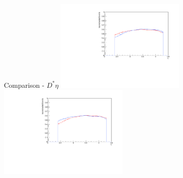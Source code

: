 \documentclass[11pt]{beamer}
\begin{document}
\begin{frame}{Comparison - $D^* \eta$}
\centering
\includegraphics[width=0.48\textwidth]{up_pdf/combined/h_eta_reco_Dst.pdf}
\includegraphics[width=0.48\textwidth]{down_pdf/combined/h_eta_reco_Dst.pdf}
\end{frame}
\end{document}

